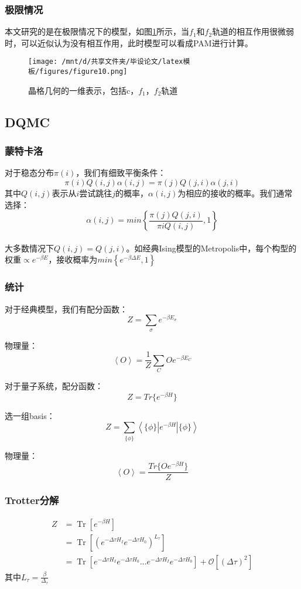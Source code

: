 \subsubsection{极限情况}
本文研究的是在极限情况下的模型，如图\ref{fig4.1.3}所示，当$f_1$和$f_2$轨道的相互作用很微弱时，可以近似认为没有相互作用，此时模型可以看成PAM进行计算。
\begin{figure}[h]
    \texttt{[image: /mnt/d/共享文件夹/毕设论文/latex模板/figures/figure10.png]}
    \caption{晶格几何的一维表示，包括c，$f_1$，$f_2$轨道}
    \label{fig4.1.3}
\end{figure}

\subsection{DQMC}%
\subsubsection{蒙特卡洛}
对于稳态分布$\pi(i)$，我们有细致平衡条件：
$$
\pi(i)Q(i,j)\alpha(i,j)=\pi(j)Q(j,i)\alpha(j,i)
$$
其中$Q(i,j)$表示从$i$尝试跳往$j$的概率，$\alpha(i,j)$为相应的接收的概率。我们通常选择：
$$
\alpha(i,j)=min\left \{\frac{\pi(j)Q(j,i)}{\pi{i}Q(i,j)},1\right \}
$$
\\大多数情况下$Q(i,j)=Q(j,i)$。如经典Ising模型的Metropolis中，每个构型的权重$\propto e^{-\beta E}$，接收概率为$min \left \{ e^{-\beta \Delta E},1 \right \}$
\subsubsection{统计}
对于经典模型，我们有配分函数：
$$
Z=\sum_\sigma e^{-\beta E_\sigma}
$$

物理量：
$$
\left \langle O \right \rangle=\frac{1}{Z} \sum_C O e^{-\beta E_C}
$$

对于量子系统，配分函数：
$$
Z=Tr\{e^{-\beta H}\}
$$

选一组basis：
$$
Z=\sum_{\{\phi \}} \left \langle \{\phi \} | e^{-\beta H}| \{\phi \} \right \rangle
$$

物理量：
$$
\left \langle O \right \rangle=\frac{Tr\{ O e^{-\beta H} \}}{Z}
$$

\subsubsection{Trotter分解}
$$
\begin{aligned}
Z &=\operatorname{Tr}\left[e^{-\beta H}\right] \\
&=\operatorname{Tr}\left[\left(e^{-\Delta \tau H_{I}} e^{-\Delta \tau H_{0}}\right)^{L_{\tau}}\right] \\
&=\operatorname{Tr}\left[e^{-\Delta \tau H_{I}} e^{-\Delta \tau H_{0}} \ldots e^{-\Delta \tau H_{I}} e^{-\Delta \tau H_{0}}\right]+\mathcal{O}\left[(\Delta \tau)^{2}\right]
\end{aligned}
$$
其中$L_\tau =\frac{\beta}{\Delta_\tau}$
